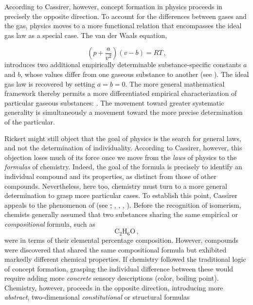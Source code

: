 \documentclass[submitted,12pt]{article}
\providecommand{\DIFdel}[1]{{\protect\color{red}\sout{#1}}}                      %
\providecommand{\DIFdelbegin}{} %
\providecommand{\DIFdelend}{} %
\begin{document}
According to Cassirer, however, concept formation in physics proceeds in precisely the opposite direction. To account for the differences between  gases and the  gas, physics moves to a more  functional relation that encompasses the ideal gas law as a special case. The van der Waals equation, 

\begin{equation*}
\left(p+\frac{a}{v^2}\right)(v-b)=RT\,,
\end{equation*}
%
introduces two additional empirically determinable substance-specific constants $a$ and $b$, whose values differ from one gaseous substance to another (see ). The ideal gas law is recovered by setting $a=b=0$. The more general mathematical framework thereby permits a more differentiated empirical characterization of particular gaseous substances:  . The movement toward greater systematic generality is simultaneously a movement toward the more precise determination of the particular.

Rickert might still object that the goal of physics is the search for general laws, and not the determination of individuality. According to Cassirer, however, this objection loses much of its force once we move from the \emph{laws} of physics to the \emph{formulas} of chemistry. Indeed, the goal of the formula is precisely to identify an individual compound and its properties, as distinct from those of other compounds. Nevertheless, here too, chemistry must turn to a more general determination to grasp more particular cases. To establish this point, Cassirer appeals to the phenomenon of  (see \DIFdelbegin \DIFdel{, }\DIFdelend \cite[122--24, 274--78]{Ladenburg1902}, \cite[chap.~VII]{Duhem1902}, \cite[II.III]{Wurtz1879}, \cite[lect.~IV]{Ostwald1906Leitlinien}). Before the recognition of isomerism, chemists generally assumed that two substances sharing the same empirical or \emph{compositional} formula, such as
%
\begin{equation*}
\mathrm{C}_2 \mathrm{H}_6 \mathrm{O}\,,
\end{equation*}
%
were  in terms of their elemental percentage composition. However, compounds were discovered that shared the same compositional formula but exhibited markedly different chemical properties. If chemistry followed the traditional logic of concept formation, grasping the individual difference between these  would require adding more \emph{concrete} sensory descriptions (color, boiling point\etc). Chemistry, however, proceeds in the opposite direction, introducing more \emph{abstract}, two-dimensional \emph{constitutional} or structural formulas 
\end{document}
